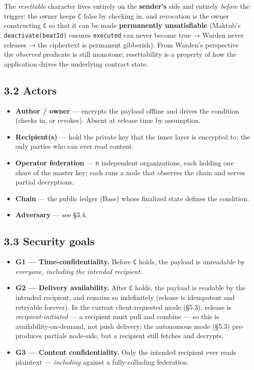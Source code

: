 \documentclass[
  11pt,
]{article}
\providecommand{\tightlist}{%
  \setlength{\itemsep}{0pt}\setlength{\parskip}{0pt}}
\begin{document}
The \emph{resettable} character lives entirely on the \textbf{sender's}
side and entirely \emph{before} the trigger: the owner keeps \texttt{C}
false by checking in, and revocation is the owner constructing
\texttt{C} so that it can be made \textbf{permanently unsatisfiable}
(Maktub's \texttt{deactivate(beatId)} ensures \texttt{executed} can
never become true → Warden never releases → the ciphertext is permanent
gibberish). From Warden's perspective the \emph{observed} predicate is
still monotone; resettability is a property of how the application
drives the underlying contract state.

\subsection{3.2 Actors}\label{actors}

\begin{itemize}
\tightlist
\item
  \textbf{Author / owner} --- encrypts the payload offline and drives
  the condition (checks in, or revokes). Absent at release time by
  assumption.
\item
  \textbf{Recipient(s)} --- hold the private key that the inner layer is
  encrypted to; the only parties who can ever read content.
\item
  \textbf{Operator federation} --- \texttt{n} independent organizations,
  each holding one share of the master key; each runs a node that
  observes the chain and serves partial decryptions.
\item
  \textbf{Chain} --- the public ledger (Base) whose finalized state
  defines the condition.
\item
  \textbf{Adversary} --- see §3.4.
\end{itemize}

\subsection{3.3 Security goals}\label{security-goals}

\begin{itemize}
\tightlist
\item
  \textbf{G1 --- Time-confidentiality.} Before \texttt{C} holds, the
  payload is unreadable by \emph{everyone, including the intended
  recipient.}
\item
  \textbf{G2 --- Delivery availability.} After \texttt{C} holds, the
  payload is readable by the intended recipient, and remains so
  indefinitely (release is idempotent and retryable forever). In the
  current client-requested mode (§5.3), release is
  \emph{recipient-initiated} --- a recipient must pull and combine ---
  so this is availability-on-demand, not push delivery; the autonomous
  mode (§5.3) pre-produces partials node-side, but a recipient still
  fetches and decrypts.
\item
  \textbf{G3 --- Content confidentiality.} Only the intended recipient
  ever reads plaintext --- \emph{including} against a fully-colluding
  federation.
\end{itemize}
\end{document}
